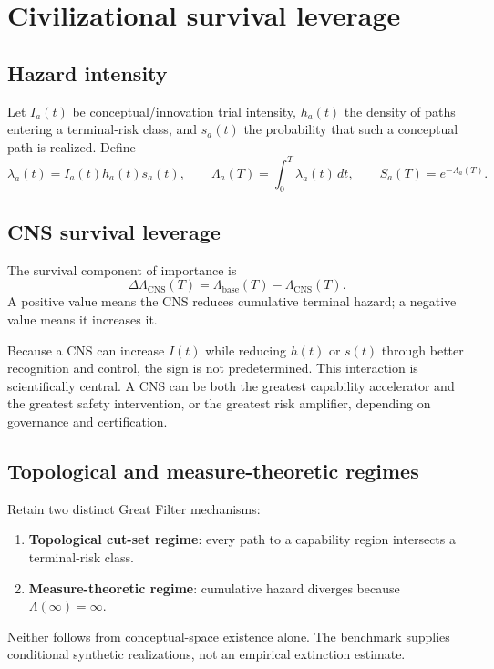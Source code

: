 \documentclass[11pt]{article}
\newcommand{\CNS}{\mathrm{CNS}}
\newcommand{\base}{\mathrm{base}}
\begin{document}
\section{Civilizational survival leverage}

\subsection{Hazard intensity}

Let $I_a(t)$ be conceptual/innovation trial intensity, $h_a(t)$ the density of paths entering a terminal-risk class,
and $s_a(t)$ the probability that such a conceptual path is realized. Define
\begin{equation}
\lambda_a(t)=I_a(t)h_a(t)s_a(t),
\qquad
\Lambda_a(T)=\int_0^T\lambda_a(t)\,dt,
\qquad
S_a(T)=e^{-\Lambda_a(T)}.
\end{equation}

\subsection{CNS survival leverage}

The survival component of importance is
\begin{equation}
\Delta\Lambda_{\CNS}(T)=\Lambda_{\base}(T)-\Lambda_{\CNS}(T).
\end{equation}
A positive value means the CNS reduces cumulative terminal hazard; a negative value means it increases it.

Because a CNS can increase $I(t)$ while reducing $h(t)$ or $s(t)$ through better recognition and control, the sign is
not predetermined. This interaction is scientifically central. A CNS can be both the greatest capability accelerator
and the greatest safety intervention, or the greatest risk amplifier, depending on governance and certification.

\subsection{Topological and measure-theoretic regimes}

Retain two distinct Great Filter mechanisms:
\begin{enumerate}
\item \textbf{Topological cut-set regime}: every path to a capability region intersects a terminal-risk class.
\item \textbf{Measure-theoretic regime}: cumulative hazard diverges because $\Lambda(\infty)=\infty$.
\end{enumerate}
Neither follows from conceptual-space existence alone. The benchmark supplies conditional synthetic realizations,
not an empirical extinction estimate.
\end{document}
